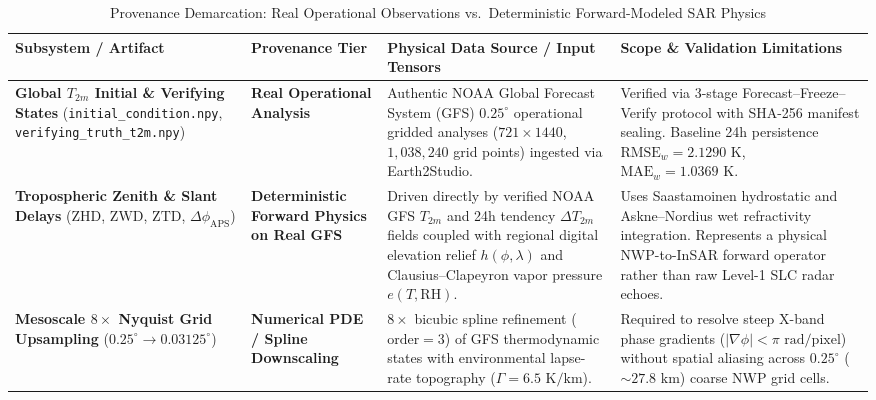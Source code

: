 \documentclass[10pt,twocolumn,letterpaper]{article}
\begin{document}
\begin{table}[t]
\centering
\footnotesize
\setlength{\tabcolsep}{4.5pt}
\caption{Provenance Demarcation: Real Operational Observations vs.\ Deterministic Forward-Modeled SAR Physics}
\label{tab:provenance_boundaries}
\vspace{0.1cm}
\begin{tabularx}{\textwidth}{>{\raggedright\arraybackslash}p{3.6cm} >{\raggedright\arraybackslash}p{3.2cm} >{\raggedright\arraybackslash}p{4.7cm} >{\raggedright\arraybackslash}X}
\toprule
\textbf{Subsystem / Artifact} & \textbf{Provenance Tier} & \textbf{Physical Data Source / Input Tensors} & \textbf{Scope \& Validation Limitations} \\
\midrule
\textbf{Global $T_{2m}$ Initial \& Verifying States} \newline (\texttt{initial\_condition.npy}, \texttt{verifying\_truth\_t2m.npy}) & \textcolor{navyblue}{\textbf{Real Operational Analysis}} & Authentic NOAA Global Forecast System (GFS) $0.25^\circ$ operational gridded analyses ($721 \times 1440$, $1,038,240$ grid points) ingested via Earth2Studio. & Verified via 3-stage Forecast--Freeze--Verify protocol with SHA-256 manifest sealing. Baseline 24h persistence $\text{RMSE}_w = 2.1290\text{ K}$, $\text{MAE}_w = 1.0369\text{ K}$. \\
\addlinespace[0.10cm]
\textbf{Tropospheric Zenith \& Slant Delays} \newline ($\text{ZHD}$, $\text{ZWD}$, $\text{ZTD}$, $\Delta\phi_{\text{APS}}$) & \textcolor{accentteal}{\textbf{Deterministic Forward Physics on Real GFS}} & Driven directly by verified NOAA GFS $T_{2m}$ and 24h tendency $\Delta T_{2m}$ fields coupled with regional digital elevation relief $h(\phi,\lambda)$ and Clausius--Clapeyron vapor pressure $e(T, \text{RH})$. & Uses Saastamoinen hydrostatic and Askne--Nordius wet refractivity integration. Represents a physical NWP-to-InSAR forward operator rather than raw Level-1 SLC radar echoes. \\
\addlinespace[0.10cm]
\textbf{Mesoscale $8\times$ Nyquist Grid Upsampling} \newline ($0.25^\circ \to 0.03125^\circ$) & \textcolor{accentteal}{\textbf{Numerical PDE / Spline Downscaling}} & $8\times$ bicubic spline refinement ($\text{order}=3$) of GFS thermodynamic states with environmental lapse-rate topography ($\Gamma = 6.5\text{ K/km}$). & Required to resolve steep X-band phase gradients ($\lvert\nabla\phi\rvert < \pi\text{ rad/pixel}$) without spatial aliasing across $0.25^\circ$ ($\sim 27.8\text{ km}$) coarse NWP grid cells. \\

\end{tabularx}
\end{table}
\end{document}
